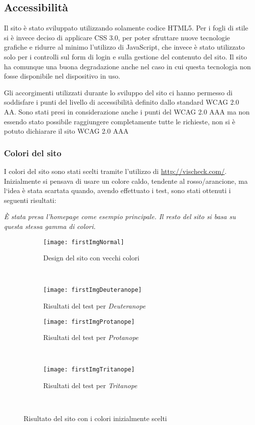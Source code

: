 \graphicspath{ {res/img/} }

\subsection{Accessibilità}
Il sito è stato sviluppato utilizzando solamente codice HTML5. Per i fogli di stile si è invece deciso di applicare CSS 3.0, per poter sfruttare nuove tecnologie grafiche e ridurre al minimo l'utilizzo di JavaScript, che invece è stato utilizzato solo per i controlli sul form di login e sulla gestione del contenuto del sito. Il sito ha comunque una buona degradazione anche nel caso in cui questa tecnologia non fosse disponibile nel dispositivo in uso.

Gli accorgimenti utilizzati durante lo sviluppo del sito ci hanno permesso di soddisfare i punti del livello di accessibilità definito dallo standard WCAG 2.0 AA. Sono stati presi in considerazione anche i punti del WCAG 2.0 AAA ma non essendo stato possibile raggiungere completamente tutte le richieste, non si è potuto dichiarare il sito WCAG 2.0 AAA

\subsubsection{Colori del sito}
I colori del sito sono stati scelti tramite l'utilizzo di \url{http://vischeck.com/}. Inizialmente si pensava di usare un colore caldo, tendente al rosso/arancione, ma l`idea \`e stata scartata quando, avendo effettuato i test, sono stati ottenuti i seguenti risultati:

\textit{\`E stata presa l'homepage come esempio principale. Il resto del sito si basa su questa stessa gamma di colori.}

\begin{figure}[H]
    \centering
    \begin{subfigure}[b]{0.45\textwidth}
        \texttt{[image: firstImgNormal]}
        \caption{Design del sito con vecchi colori}
    \end{subfigure}
    ~
    \begin{subfigure}[b]{0.45\textwidth}
        \texttt{[image: firstImgDeuteranope]}
        \caption{Risultati del test per \textit{Deuteranope}}
    \end{subfigure}
    \newline
    \begin{subfigure}[b]{0.45\textwidth}
        \texttt{[image: firstImgProtanope]}
        \caption{Risultati del test per \textit{Protanope}}
    \end{subfigure}
    ~
    \begin{subfigure}[b]{0.45\textwidth}
        \texttt{[image: firstImgTritanope]}
        \caption{Risultati del test per \textit{Tritanope}}
    \end{subfigure}
    ~
    \caption{Risultato del sito con i colori inizialmente scelti}
\end{figure}


